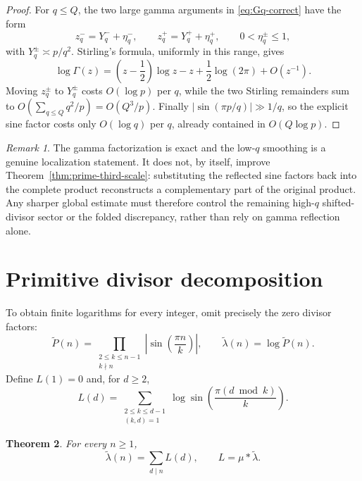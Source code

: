 \documentclass[11pt]{amsart}
\numberwithin{equation}{section}
\newtheorem{theorem}{Theorem}[section]
\theoremstyle{definition}
\theoremstyle{remark}
\newtheorem{remark}[theorem]{Remark}
\begin{document}
\begin{proof}
For \(q\le Q\), the two large gamma arguments in
\eqref{eq:Gq-correct} have the form
\[
 z_q^-=Y_q^-+\eta_q^-,\qquad
 z_q^+=Y_q^++\eta_q^+,
 \qquad 0<\eta_q^\pm\le1,
\]
with \(Y_q^\pm\asymp p/q^2\).  Stirling's formula, uniformly in this
range, gives
\[
 \log\Gamma(z)=\left(z-\frac12\right)\log z-z
 +\frac12\log(2\pi)+O(z^{-1}).
\]
Moving \(z_q^\pm\) to \(Y_q^\pm\) costs \(O(\log p)\) per \(q\), while
the two Stirling remainders sum to
\(O(\sum_{q\le Q}q^2/p)=O(Q^3/p)\).  Finally
\(|\sin(\pi p/q)|\gg1/q\), so the explicit sine factor costs only
\(O(\log q)\) per \(q\), already contained in \(O(Q\log p)\).
\end{proof}

\begin{remark}\label{rem:gamma-limitation}
The gamma factorization is exact and the low-\(q\) smoothing is a genuine
localization statement.  It does not, by itself, improve
Theorem~\ref{thm:prime-third-scale}: substituting the reflected sine
factors back into the complete product reconstructs a complementary part of
the original product.  Any sharper global estimate must therefore control
the remaining high-\(q\) shifted-divisor sector or the folded discrepancy,
rather than rely on gamma reflection alone.
\end{remark}

\section{Primitive divisor decomposition}
\label{sec:primitive}

To obtain finite logarithms for every integer, omit precisely the zero
divisor factors:
\begin{equation}\label{eq:Ptilde}
 \widetilde P(n)=
 \prod_{\substack{2\leq k\leq n-1\\k\nmid n}}
 \left|\sin\!\left(\frac{\pi n}{k}\right)\right|,
 \qquad
 \widetilde\lambda(n)=\log\widetilde P(n).
\end{equation}
Define \(L(1)=0\) and, for \(d\geq2\),
\begin{equation}\label{eq:L-def}
 L(d)=\sum_{\substack{2\leq k\leq d-1\\(k,d)=1}}
 \log\sin\!\left(\frac{\pi(d\bmod k)}{k}\right).
\end{equation}

\begin{theorem}\label{thm:primitive}
For every \(n\geq1\),
\begin{equation}\label{eq:primitive}
 \widetilde\lambda(n)=\sum_{d\mid n}L(d),
 \qquad L=\mu*\widetilde\lambda.
\end{equation}
\end{theorem}
\end{document}

